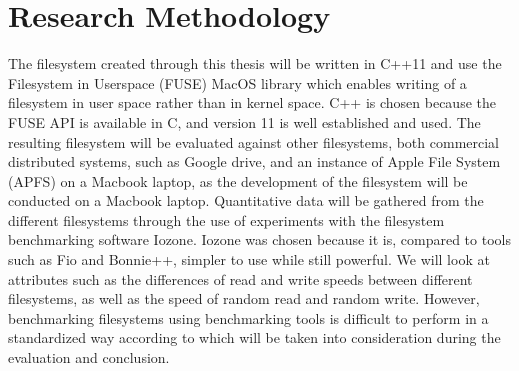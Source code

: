 
\section{Research Methodology}%

The filesystem created through this thesis will be written in C++11 and use the Filesystem in Userspace (FUSE) MacOS library\cite{HomeMacFUSE} which enables writing of a filesystem in user space rather than in kernel space. C++ is chosen because the FUSE API is available in C, and version 11 is well established and used. The resulting filesystem will be evaluated against other filesystems, both commercial distributed systems, such as Google drive, and an instance of Apple File System (APFS)\cite{AppleFileSystem} on a Macbook laptop, as the development of the filesystem will be conducted on a Macbook laptop. Quantitative data will be gathered from the different filesystems through the use of experiments with the filesystem benchmarking software Iozone\cite{IozoneFilesystemBenchmark}. Iozone was chosen because it is, compared to tools such as Fio and Bonnie++, simpler to use while still powerful\cite{agarwalComparingIOBenchmarks2018}. We will look at attributes such as the differences of read and write speeds between different filesystems, as well as the speed of random read and random write. However, benchmarking filesystems using benchmarking tools is difficult to perform in a standardized way according to \citeauthor{tarasovBenchmarkingFileSystem2011}\cite{tarasovBenchmarkingFileSystem2011} which will be taken into consideration during the evaluation and conclusion.